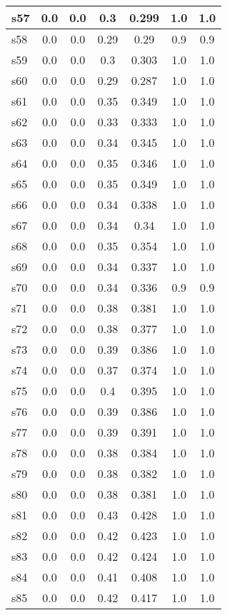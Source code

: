 \documentclass{article}
\begin{document}
\begin{tabular}{|l|c|c|c|c|c|c|}
\hline
s57 &0.0 & 0.0 & 0.3 & 0.299 & 1.0 & 1.0\\
\hline
s58 &0.0 & 0.0 & 0.29 & 0.29 & 0.9 & 0.9\\
\hline
s59 &0.0 & 0.0 & 0.3 & 0.303 & 1.0 & 1.0\\
\hline
s60 &0.0 & 0.0 & 0.29 & 0.287 & 1.0 & 1.0\\
\hline
s61 &0.0 & 0.0 & 0.35 & 0.349 & 1.0 & 1.0\\
\hline
s62 &0.0 & 0.0 & 0.33 & 0.333 & 1.0 & 1.0\\
\hline
s63 &0.0 & 0.0 & 0.34 & 0.345 & 1.0 & 1.0\\
\hline
s64 &0.0 & 0.0 & 0.35 & 0.346 & 1.0 & 1.0\\
\hline
s65 &0.0 & 0.0 & 0.35 & 0.349 & 1.0 & 1.0\\
\hline
s66 &0.0 & 0.0 & 0.34 & 0.338 & 1.0 & 1.0\\
\hline
s67 &0.0 & 0.0 & 0.34 & 0.34 & 1.0 & 1.0\\
\hline
s68 &0.0 & 0.0 & 0.35 & 0.354 & 1.0 & 1.0\\
\hline
s69 &0.0 & 0.0 & 0.34 & 0.337 & 1.0 & 1.0\\
\hline
s70 &0.0 & 0.0 & 0.34 & 0.336 & 0.9 & 0.9\\
\hline
s71 &0.0 & 0.0 & 0.38 & 0.381 & 1.0 & 1.0\\
\hline
s72 &0.0 & 0.0 & 0.38 & 0.377 & 1.0 & 1.0\\
\hline
s73 &0.0 & 0.0 & 0.39 & 0.386 & 1.0 & 1.0\\
\hline
s74 &0.0 & 0.0 & 0.37 & 0.374 & 1.0 & 1.0\\
\hline
s75 &0.0 & 0.0 & 0.4 & 0.395 & 1.0 & 1.0\\
\hline
s76 &0.0 & 0.0 & 0.39 & 0.386 & 1.0 & 1.0\\
\hline
s77 &0.0 & 0.0 & 0.39 & 0.391 & 1.0 & 1.0\\
\hline
s78 &0.0 & 0.0 & 0.38 & 0.384 & 1.0 & 1.0\\
\hline
s79 &0.0 & 0.0 & 0.38 & 0.382 & 1.0 & 1.0\\
\hline
s80 &0.0 & 0.0 & 0.38 & 0.381 & 1.0 & 1.0\\
\hline
s81 &0.0 & 0.0 & 0.43 & 0.428 & 1.0 & 1.0\\
\hline
s82 &0.0 & 0.0 & 0.42 & 0.423 & 1.0 & 1.0\\
\hline
s83 &0.0 & 0.0 & 0.42 & 0.424 & 1.0 & 1.0\\
\hline
s84 &0.0 & 0.0 & 0.41 & 0.408 & 1.0 & 1.0\\
\hline
s85 &0.0 & 0.0 & 0.42 & 0.417 & 1.0 & 1.0\\

\end{tabular}
\end{document}
